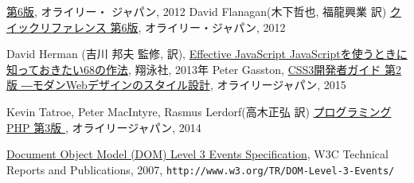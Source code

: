 \begin{thebibliography}{99}
\href{http://www.amazon.co.jp/JavaScript-第6版-David-Flanagan/dp/4873115736/ref=sr_1_1?ie=UTF8&qid=1353802698&sr=8-1}{\JS{} 第6版}, オライリー・
	 ジャパン, 2012
 David Flanagan(木下哲也, 福龍興業 訳) 
            \href{http://www.amazon.co.jp/JavaScriptリファレンス-第6版-David-Flanagan/dp/4873115531/ref=sr_1_11?ie=UTF8&qid=1353802698&sr=8-11}
{\JS{} クイックリファレンス 第6版}, オライリー・ジャパン, 2012
\iffalse
 \bibitem{geroimenko}
Vladimir Geroimenko, Chaomei Chen(Ed.),\\
\href{http://www.amazon.co.jp/exec/obidos/ASIN/1852337907/qid=1146667282/sr=1-1/ref=sr_1_10_1/249-3353534-4529100}
   {\it Visualizing
	Information Using SVG and X3D: XML-based Technologies For The
	XML-based Web}, Springer Verlag 2005
				 \fi
\ifSeminor\else
{}David Herman (吉川 邦夫 監修, 訳),
\href{http://www.amazon.co.jp/Effective-JavaScript-JavaScript%E3%82%92%E4%BD%BF%E3%81%86%E3%81%A8%E3%81%8D%E3%81%AB%E7%9F%A5%E3%81%A3%E3%81%A6%E3%81%8A%E3%81%8D%E3%81%9F%E3%81%8468%E3%81%AE%E5%86%B4%E3%81%88%E3%81%9F%E3%82%84%E3%82%8A%E6%96%B9-David-Herman/dp/4798131113/ref=sr_1_1?ie=UTF8&qid=1365329955&sr=8-1&keywords=JavaScript%E3%82%92%E4%BD%BF%E3%81%86%E3%81%A8%E3%81%8D%E3%81%AB%E7%9F%A5%E3%81%A3%E3%81%A6%E3%81%8A%E3%81%8D%E3%81%9F%E3%81%84%EF%BC%96%EF%BC%98}
{Effective JavaScript JavaScriptを使うときに知っておきたい68の作法}, 
翔泳社, 2013年
\fi
 Peter Gasston,
				 \href{https://www.amazon.co.jp/s/ref=nb_sb_ss_i_5_4/351-1343008-2819052?__mk_ja_JP=%E3%82%AB%E3%82%BF%E3%82%AB%E3%83%8A&url=search-alias%3Daps&field-keywords=css3%E9%96%8B%E7%99%BA%E8%80%85%E3%82%AC%E3%82%A4%E3%83%89&sprefix=css3%2Caps%2C226&crid=2KO0TT8P0FOGT}{CSS3開発者ガイド 第2版 ―モダンWebデザインのスタイル設計},
				 オライリージャパン, 2015

\ifSeminor\else
Kevin Tatroe, Peter MacIntyre, Rasmus Lerdorf(高木正弘 訳)
\href{https://www.amazon.co.jp/%E3%83%97%E3%83%AD%E3%82%B0%E3%83%A9%E3%83%9F%E3%83%B3%E3%82%B0PHP-%E7%AC%AC3%E7%89%88-Kevin-Tatroe/dp/4873116686/ref=sr_1_4?s=books&ie=UTF8&qid=1527115295&sr=1-4&keywords=PHP+3%E7%89%88}
        {プログラミングPHP 第3版 },  オライリージャパン, 2014
\fi
\iffalse
 \bibitem{JSObject}Stoyan Stefanov(水野貴明, 渋川よしき 訳)
\href{http://www.amazon.co.jp/オブジェクト指向
	JavaScript-Stoyan-Stefanov/dp/4048706705/ref=sr_1_1?ie=UTF8&qid=1353803180&sr=8-1}
{オブジェクト指向JavaScript}, アスキー・メディアワークス, 2012
\fi
\href{http://www.w3.org/TR/2007/DOM-Level-3-Events-20071221/}
{Document Object Model (DOM) Level 3 Events Specification},
    W3C Technical Reports and Publications, 2007,
\texttt{http://www.w3.org/TR/DOM-Level-3-Events/}


\end{thebibliography}
